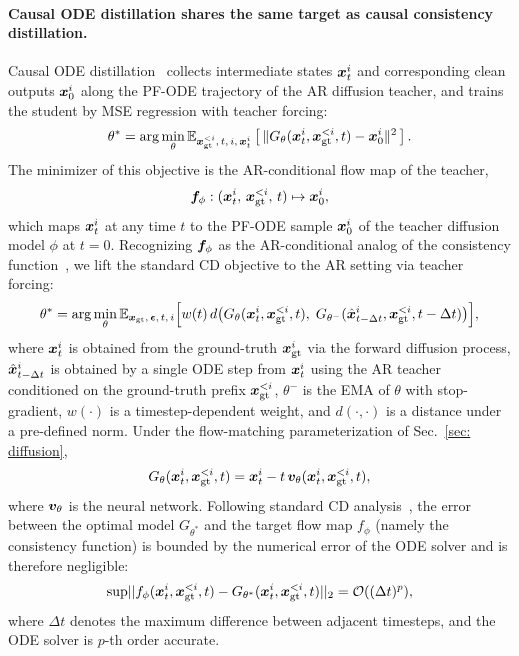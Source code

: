 \paragraph{Causal ODE distillation shares the same target as causal consistency distillation.}
Causal ODE distillation~\cite{zhu2026causal} collects intermediate states ${\bm{x}}_t^i$ and corresponding clean outputs ${\bm{x}}_0^i$ along the PF-ODE trajectory of the AR diffusion teacher, and trains the student by MSE regression with teacher forcing:
\begin{align}
    \theta^*=\arg\min_\theta \mathbb{E}_{{\bm{x}}_{\mathrm{gt}}^{<i},\, t,\, i,\, {\bm{x}}_t^i}\left[\,\|G_\theta({\bm{x}}_t^i,{\bm{x}}_{\mathrm{gt}}^{<i}, t)-{\bm{x}}_0^i\|^2\,\right].
\end{align}
The minimizer of this objective is the AR-conditional flow map of the teacher,
\begin{align}
    {\bm{f}}_\phi:({\bm{x}}_t^i,\,{\bm{x}}_{\mathrm{gt}}^{<i},\,t)\mapsto {\bm{x}}_0^i,
\end{align}
which maps ${\bm{x}}_t^i$ at any time $t$ to the PF-ODE sample ${\bm{x}}_0^i$ of the teacher diffusion model $\phi$ at $t=0$. 
Recognizing ${\bm{f}}_\phi$ as the AR-conditional analog of the consistency function~\cite{song2023consistency,song2023improved,wang2024phased,lu2024simplifying,zheng2025large}, we lift the standard CD objective to the AR setting via teacher forcing:
\begin{align}
\label{eq:causal-cd}
\theta^*=\arg\min_\theta \mathbb{E}_{{\bm{x}}_\text{gt},\,{\bm{\epsilon}},\,t,\,i}\Big[w(t)\,d\big(G_\theta({\bm{x}}_t^i,{\bm{x}}_\text{gt}^{<i}, t),\; G_{\theta^-}(\hat{{\bm{x}}}^i_{t-\Delta t},{\bm{x}}_\text{gt}^{<i}, t-\Delta t)\big)\Big],
\end{align}
where ${\bm{x}}_t^i$ is obtained from the ground-truth ${\bm{x}}_\text{gt}^i$ via the forward diffusion process, $\hat{{\bm{x}}}^i_{t-\Delta t}$ is obtained by a single ODE step from ${\bm{x}}_t^i$ using the AR teacher conditioned on the ground-truth prefix ${\bm{x}}_\text{gt}^{<i}$, $\theta^-$ is the EMA of $\theta$ with stop-gradient, $w(\cdot)$ is a timestep-dependent weight, and $d(\cdot,\cdot)$ is a distance under a pre-defined norm. Under the flow-matching parameterization of Sec.~\ref{sec: diffusion},
\begin{align}
G_\theta({\bm{x}}_t^i,{\bm{x}}_\text{gt}^{<i},t) = {\bm{x}}_t^i - t\,{\bm{v}}_\theta({\bm{x}}_t^i,{\bm{x}}_\text{gt}^{<i},t),
\end{align}
where ${\bm{v}}_\theta$ is the neural network. Following standard CD analysis~\cite{song2023consistency}, the error between the optimal model $G_{\theta^*}$ and the target flow map $f_\phi$ (namely the consistency function) is bounded by the numerical error of the ODE solver and is therefore negligible:
\begin{align}
    \mathrm{sup}||f_\phi({\bm{x}}_t^i, {\bm{x}}_{\mathrm{gt}}^{<i},t) - G_{\theta^*}({\bm{x}}_t^i, {\bm{x}}_{\mathrm{gt}}^{<i},t)||_2 = {\mathcal{O}}((\Delta t)^p),
\end{align}
where $\Delta t$ denotes the maximum difference between adjacent timesteps, and the ODE solver is $p$-th order accurate.

